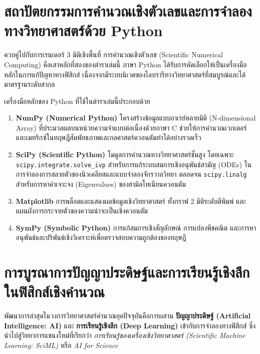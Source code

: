 \section{สถาปัตยกรรมการคำนวณเชิงตัวเลขและการจำลองทางวิทยาศาสตร์ด้วย Python}

ควบคู่ไปกับการเรนเดอร์ 3 มิติเชิงพื้นที่ การคำนวณเชิงตัวเลข (Scientific Numerical Computing) คือเสาหลักที่สองของตำราเล่มนี้ ภาษา Python ได้รับการคัดเลือกให้เป็นเครื่องมือหลักในการแก้ปัญหาทางฟิสิกส์ เนื่องจากมีระบบนิเวศของไลบรารีทางวิทยาศาสตร์ที่สมบูรณ์และได้มาตรฐานระดับสากล

เครื่องมือหลักของ Python ที่ใช้ในตำราเล่มนี้ประกอบด้วย
\begin{enumerate}
    \item \textbf{NumPy (Numerical Python)} โครงสร้างข้อมูลแบบอาเรย์หลายมิติ (N-dimensional Array) ที่ประมวลผลบนหน่วยความจำแบบต่อเนื่องด้วยภาษา C ช่วยให้การคำนวณเวกเตอร์และเมทริกซ์ในทฤษฎีสัมพัทธภาพและกลศาสตร์ควอนตัมทำได้อย่างรวดเร็ว
    \item \textbf{SciPy (Scientific Python)} โมดูลการคำนวณทางวิทยาศาสตร์ชั้นสูง โดยเฉพาะ \texttt{scipy.integrate.solve\_ivp} สำหรับการแก้ระบบสมการเชิงอนุพันธ์สามัญ (ODEs) ในการจำลองการสลายตัวของนิวเคลียสและแบบจำลองจักรวาลวิทยา ตลอดจน \texttt{scipy.linalg} สำหรับการหาค่าเจาะจง (Eigenvalues) ของฮามิลโทเนียนควอนตัม
    \item \textbf{Matplotlib} การพล็อตและแสดงผลข้อมูลเชิงวิทยาศาสตร์ ทั้งกราฟ 2 มิติระดับตีพิมพ์ และแผนผังการกระจายตัวของความน่าจะเป็นเชิงควอนตัม
    \item \textbf{SymPy (Symbolic Python)} การแก้สมการเชิงสัญลักษณ์ การแปลงพีชคณิต และการหาอนุพันธ์และปริพันธ์เชิงวิเคราะห์เพื่อตรวจสอบความถูกต้องของทฤษฎี
\end{enumerate}

\section{การบูรณาการปัญญาประดิษฐ์และการเรียนรู้เชิงลึกในฟิสิกส์เชิงคำนวณ}

พัฒนาการล่าสุดในวงการวิทยาศาสตร์คำนวณยุคปัจจุบันคือการผสาน \textbf{ปัญญาประดิษฐ์ (Artificial Intelligence: AI)} และ \textbf{การเรียนรู้เชิงลึก (Deep Learning)} เข้ากับการจำลองทางฟิสิกส์ ซึ่งนำไปสู่วิทยาการแขนงใหม่ที่เรียกว่า \textit{การเรียนรู้ของเครื่องเชิงวิทยาศาสตร์ (Scientific Machine Learning: SciML)} หรือ \textit{AI for Science}

